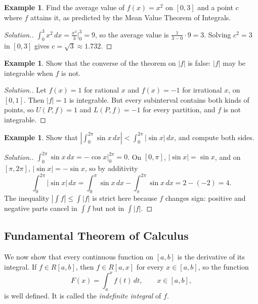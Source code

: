 \documentclass[11pt,a4paper]{article}
\numberwithin{equation}{section}
\theoremstyle{definition}
\newtheorem{exa}[thm]{Example}
\newenvironment{solution}
  {\renewcommand{\qedsymbol}{}\begin{proof}[\textit{Solution}.]}
  {\end{proof}}
\begin{document}
\begin{exa}
Find the average value of $f(x) = x^2$ on $[0,3]$ and a point $c$ where $f$ attains it, as predicted by the Mean Value Theorem of Integrals.
\end{exa}

\begin{solution}
$\int_0^3x^2\,dx = \frac{x^3}{3}\Big|_0^3 = 9$, so the average value is $\frac{1}{3-0}\cdot 9 = 3$. Solving $c^2 = 3$ in $[0,3]$ gives $c = \sqrt{3}\approx 1.732$.
\end{solution}

\begin{exa}
Show that the converse of the theorem on $|f|$ is false: $|f|$ may be integrable when $f$ is not.
\end{exa}

\begin{solution}
Let $f(x) = 1$ for rational $x$ and $f(x) = -1$ for irrational $x$, on $[0,1]$. Then $|f| = 1$ is integrable. But every subinterval contains both kinds of points, so $U(P,f) = 1$ and $L(P,f) = -1$ for every partition, and $f$ is not integrable.
\end{solution}

\begin{exa}
Show that $\left|\int_0^{2\pi}\sin x\,dx\right|<\int_0^{2\pi}|\sin x|\,dx$, and compute both sides.
\end{exa}

\begin{solution}
$\int_0^{2\pi}\sin x\,dx = -\cos x\Big|_0^{2\pi} = 0$. On $[0,\pi]$, $|\sin x| = \sin x$, and on $[\pi,2\pi]$, $|\sin x| = -\sin x$, so by additivity
$$\int_0^{2\pi}|\sin x|\,dx = \int_0^\pi\sin x\,dx - \int_\pi^{2\pi}\sin x\,dx = 2 - (-2) = 4 .$$
The inequality $|\int f|\leq\int|f|$ is strict here because $f$ changes sign: positive and negative parts cancel in $\int f$ but not in $\int|f|$.
\end{solution}


\subsection{Fundamental Theorem of Calculus}

We now show that every continuous function on $[a,b]$ is the derivative of its integral. If $f\in R[a,b]$, then $f\in R[a,x]$ for every $x\in [a,b]$, so the function
$$F(x) = \int^x_af(t)\, dt,\qquad x\in [a,b],$$
is well defined. It is called the \emph{indefinite integral} of $f$.
\end{document}

